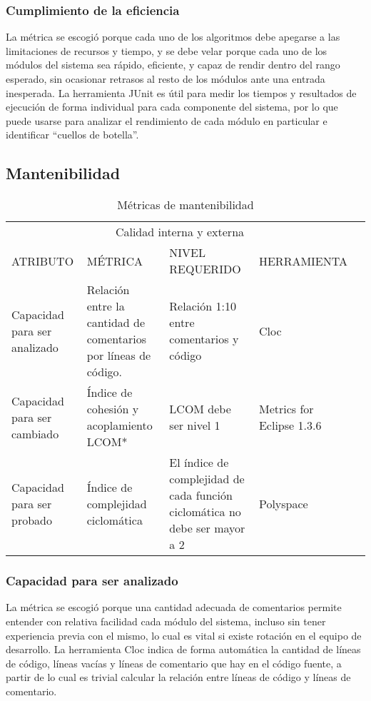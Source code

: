 \documentclass[12pt]{article}
\begin{document}
\subsubsection{Cumplimiento de la eficiencia}
\vspace*{0.1in}
La métrica se escogió porque cada uno de los algoritmos debe apegarse a las limitaciones de recursos y tiempo, y se debe velar porque cada uno de los módulos del sistema sea rápido, eficiente, y capaz de rendir dentro del rango esperado, sin ocasionar retrasos al resto de los módulos ante una entrada inesperada. La herramienta JUnit es útil para medir los tiempos y resultados de ejecución de forma individual para cada componente del sistema, por lo que puede usarse para analizar el rendimiento de cada módulo en particular e identificar “cuellos de botella”.


\vspace*{0.3in}
\subsection{Mantenibilidad}%
\vspace*{0.3in}
\begin{table}[htb]%
\centering
\begin{tabular}{|p{4cm}|p{4cm}|p{4cm}|p{4cm}|p{4cm}|}
\hline
\multicolumn{4}{|c|}{Calidad interna y externa   } \\
\cline{1-4}
ATRIBUTO & MÉTRICA & NIVEL REQUERIDO & HERRAMIENTA\\
\hline \hline
Capacidad para ser analizado 
& Relación entre la cantidad de comentarios por líneas de código.
& Relación 1:10 entre comentarios y código
& Cloc\\ \cline{1-4}
\hline
Capacidad para ser cambiado 
& Índice de cohesión y acoplamiento LCOM*
& LCOM debe ser nivel 1
& Metrics for Eclipse 1.3.6\\ \cline{1-4}
\hline
Capacidad para ser probado
& Índice de complejidad ciclomática
& El índice de complejidad de cada función ciclomática no debe ser mayor a 2 
& Polyspace\\ \cline{1-4}
\hline
\end{tabular}
\caption{Métricas de mantenibilidad}
\label{tabla:final}
\end{table}%
\vspace*{0.3in}
\subsubsection{Capacidad para ser analizado}
\vspace*{0.1in}
La métrica se escogió porque una cantidad adecuada de comentarios permite entender con relativa facilidad cada módulo del sistema, incluso sin tener experiencia previa con el mismo, lo cual es vital si existe rotación en el equipo de desarrollo. La herramienta Cloc indica de forma automática la cantidad de líneas de código, líneas vacías y líneas de comentario que hay en el código fuente, a partir de lo cual es trivial calcular la relación entre líneas de código y líneas de comentario.
\vspace*{0.3in}
\end{document}
